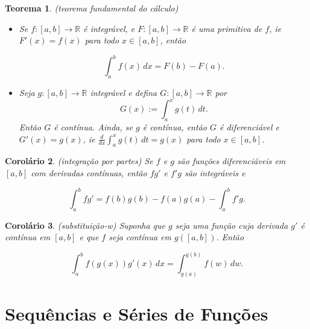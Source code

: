 \documentclass[12pt]{article}
\theoremstyle{plain}
\newtheorem{thm}{Teorema}[section]
\newtheorem{cor}[thm]{Corolário}
\theoremstyle{definition}
\theoremstyle{remark}
\begin{document}
\begin{thm} (teorema fundamental do cálculo)
    \begin{itemize}
        \item[(i)] Se \(f : [a,b] \to \mathbb{R}\) é integrável, e \(F : [a,b] \to \mathbb{R}\) é uma primitiva de \(f\), ie \(F'(x) = f(x)\) para todo \(x \in [a,b]\), então

        \begin{equation}
            \int_a^b f(x) \, dx = F(b) - F(a).
        \end{equation}

        \item[(ii)] Seja \(g : [a,b] \to \mathbb{R}\) integrável e defina \(G : [a,b] \to \mathbb{R}\) por \[G(x) := \int_{a}^{x} g(t) \, dt.\] Então \(G\) é contínua. Ainda, se \(g\) é contínua, então \(G\) é diferenciável e \(G'(x) = g(x)\), ie \(\displaystyle\frac{d}{dx} \int_{a}^{x} g(t) \, dt = g(x)\) para todo \(x \in [a,b]\).

    \end{itemize}
\end{thm}

\begin{cor} (integração por partes)
    Se \(f\) e \(g\) são funções diferenciáveis em \([a,b]\) com derivadas contínuas, então \(fg'\) e \(f'g\) são integráveis e

    \begin{equation}
        \int_{a}^{b} fg' = f(b)g(b) - f(a)g(a) - \int_{a}^{b} f'g.
    \end{equation}
\end{cor}

\begin{cor} (substituição-w)
    Suponha que \(g\) seja uma função cuja derivada \(g'\) é contínua em \([a,b]\) e que \(f\) seja contínua em \(g([a,b])\). Então

    \begin{equation}
        \int_{a}^{b} f(g(x)) g'(x) \, dx = \int_{g(a)}^{g(b)} f(w) \, dw.
    \end{equation}
\end{cor}

\newpage
\section{Sequências e Séries de Funções}
\end{document}
